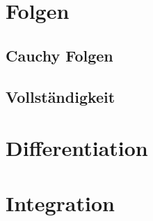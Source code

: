 
\chapter{Folgen}


\section{Cauchy Folgen}


\section{Vollständigkeit}



\chapter{Differentiation}\label{chap:diff}



\chapter{Integration}


